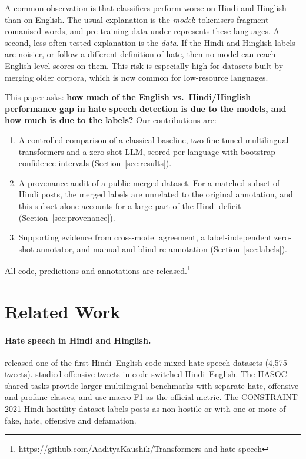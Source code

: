 \documentclass[11pt,a4paper]{article}
\begin{document}
A common observation is that classifiers perform worse on Hindi and Hinglish than on English.
The usual explanation is the \emph{model}: tokenisers fragment romanised words, and pre-training data under-represents these languages.
A second, less often tested explanation is the \emph{data}.
If the Hindi and Hinglish labels are noisier, or follow a different definition of hate, then no model can reach English-level scores on them.
This risk is especially high for datasets built by merging older corpora, which is now common for low-resource languages.

This paper asks: \textbf{how much of the English vs.\ Hindi/Hinglish performance gap in hate speech detection is due to the models, and how much is due to the labels?}
Our contributions are:
\begin{enumerate}
  \item A controlled comparison of a classical baseline, two fine-tuned multilingual transformers and a zero-shot LLM, scored per language with bootstrap confidence intervals (Section~\ref{sec:results}).
  \item A provenance audit of a public merged dataset. For a matched subset of Hindi posts, the merged labels are unrelated to the original annotation, and this subset alone accounts for a large part of the Hindi deficit (Section~\ref{sec:provenance}).
  \item Supporting evidence from cross-model agreement, a label-independent zero-shot annotator, and manual and blind re-annotation (Section~\ref{sec:labels}).
\end{enumerate}
All code, predictions and annotations are released.\footnote{\url{https://github.com/AadityaKaushik/Transformers-and-hate-speech}}

\section{Related Work}

\paragraph{Hate speech in Hindi and Hinglish.}
\citet{bohra2018dataset} released one of the first Hindi--English code-mixed hate speech datasets (4,575 tweets).
\citet{mathur2018detecting} studied offensive tweets in code-switched Hindi--English.
The HASOC shared tasks \citep{mandl2019hasoc,mandl2020hasoc,modha2021hasoc} provide larger multilingual benchmarks with separate hate, offensive and profane classes, and use macro-F1 as the official metric.
The CONSTRAINT 2021 Hindi hostility dataset \citep{bhardwaj2020hostility,patwa2021constraint} labels posts as non-hostile or with one or more of fake, hate, offensive and defamation.
\end{document}

